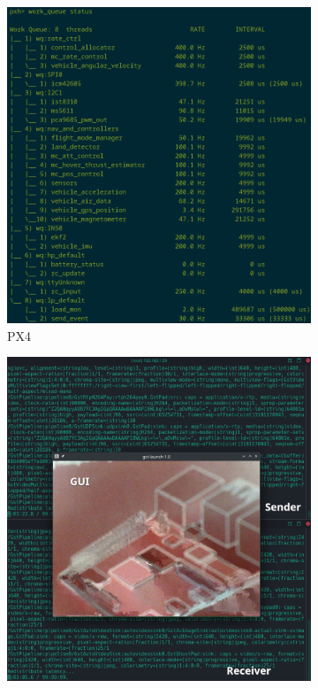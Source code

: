 \begin{figure}[!hbt]
  \centering
  \begin{subfigure}[t]{0.49\textwidth}
    \centering
    \includegraphics[width=1.0\textwidth]{./img/png/sspfs-px4-validation} 
    \caption{PX4}%
    \label{fig:sspfs-app-validation-1}
  \end{subfigure}
  \begin{subfigure}[t]{0.49\textwidth}
    \centering
    \includegraphics[width=\linewidth]{./img/png/sspfs-cam-qgc} %

\end{subfigure}
\end{figure}
